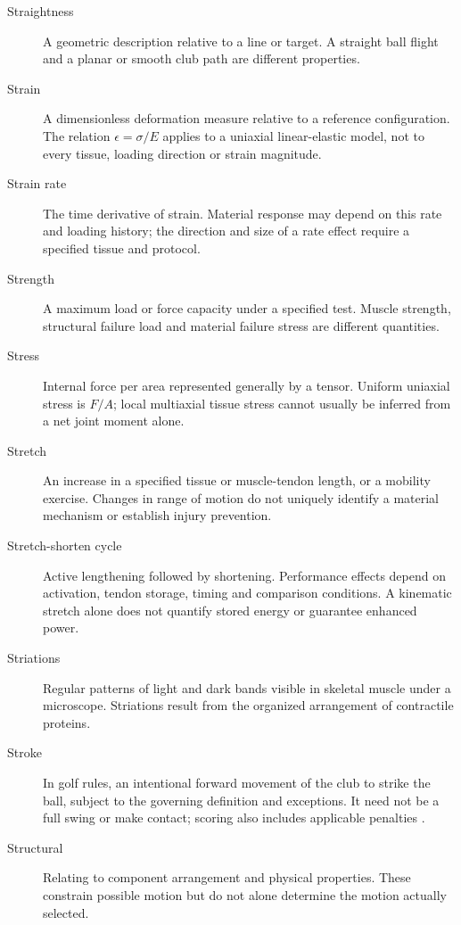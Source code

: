 \begin{description}
\item[Straightness] A geometric description relative to a line or target. A straight ball flight and a planar or smooth club path are different properties.

\item[Strain] A dimensionless deformation measure relative to a reference configuration. The relation $\epsilon=\sigma/E$ applies to a uniaxial linear-elastic model, not to every tissue, loading direction or strain magnitude.

\item[Strain rate] The time derivative of strain. Material response may depend on this rate and loading history; the direction and size of a rate effect require a specified tissue and protocol.

\item[Strength] A maximum load or force capacity under a specified test. Muscle strength, structural failure load and material failure stress are different quantities.

\item[Stress] Internal force per area represented generally by a tensor. Uniform uniaxial stress is $F/A$; local multiaxial tissue stress cannot usually be inferred from a net joint moment alone.

\item[Stretch] An increase in a specified tissue or muscle-tendon length, or a mobility exercise. Changes in range of motion do not uniquely identify a material mechanism or establish injury prevention.

\item[Stretch-shorten cycle] Active lengthening followed by shortening. Performance effects depend on activation, tendon storage, timing and comparison conditions. A kinematic stretch alone does not quantify stored energy or guarantee enhanced power.

\item[Striations] Regular patterns of light and dark bands visible in skeletal muscle under a microscope. Striations result from the organized arrangement of contractile proteins.

\item[Stroke] In golf rules, an intentional forward movement of the club to strike the ball, subject to the governing definition and exceptions. It need not be a full swing or make contact; scoring also includes applicable penalties \citep{glossaryUSGAStroke}.

\item[Structural] Relating to component arrangement and physical properties. These constrain possible motion but do not alone determine the motion actually selected.


\end{description}
